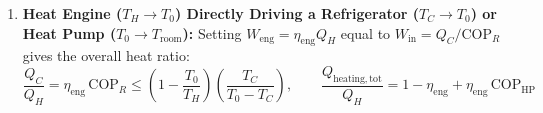 \begin{formulacard}
\begin{enumerate}
  \begin{equation}\label{eq:09:cascade-refrig}
    \boxed{\mathrm{COP}_{R,\mathrm{cascade}} = \frac{\mathrm{COP}_{R,1}\,\mathrm{COP}_{R,2}}{1 + \mathrm{COP}_{R,1} + \mathrm{COP}_{R,2}}} \iff 1 + \frac{1}{\mathrm{COP}_{R,\mathrm{cascade}}} = \left(1 + \frac{1}{\mathrm{COP}_{R,1}}\right)\left(1 + \frac{1}{\mathrm{COP}_{R,2}}\right)
  \end{equation}
  \item \textbf{Heat Engine ($T_H \to T_0$) Directly Driving a Refrigerator ($T_C \to T_0$) or Heat Pump ($T_0 \to T_{\mathrm{room}}$):}
  Setting $W_{\mathrm{eng}} = \eta_{\mathrm{eng}}Q_H$ equal to $W_{\mathrm{in}} = Q_C / \mathrm{COP}_R$ gives the overall heat ratio:
  \begin{equation}\label{eq:09:engine-driven-chiller}
    \boxed{\frac{Q_C}{Q_H} = \eta_{\mathrm{eng}}\,\mathrm{COP}_R \le \left(1 - \frac{T_0}{T_H}\right)\left(\frac{T_C}{T_0 - T_C}\right)}, \qquad \frac{Q_{\mathrm{heating,tot}}}{Q_H} = 1 - \eta_{\mathrm{eng}} + \eta_{\mathrm{eng}}\,\mathrm{COP}_{\mathrm{HP}}
  \end{equation}
\end{enumerate}
\end{formulacard}

